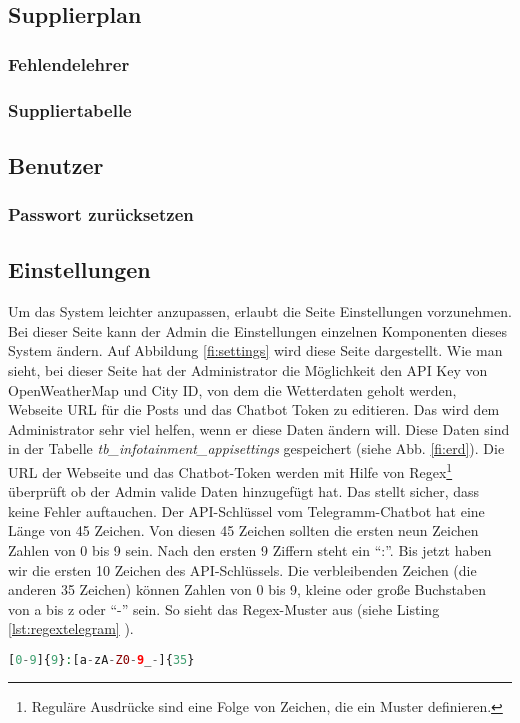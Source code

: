 \subsection{Supplierplan}
\subsubsection{Fehlendelehrer}
\subsubsection{Suppliertabelle}
\subsection{Benutzer}
\subsubsection{Passwort zurücksetzen}

\subsection{Einstellungen}
Um das System leichter anzupassen, erlaubt die Seite Einstellungen vorzunehmen. Bei dieser Seite kann der Admin die Einstellungen einzelnen Komponenten dieses System ändern. Auf Abbildung \ref{fi:settings} wird diese Seite dargestellt. Wie man sieht, bei dieser Seite hat der Administrator die Möglichkeit den API Key von OpenWeatherMap und City ID, von dem die Wetterdaten geholt werden, Webseite URL für die Posts und das Chatbot Token zu editieren. Das wird dem Administrator sehr viel helfen, wenn er diese Daten ändern will. Diese Daten sind in der Tabelle \textit{tb\_infotainment\_appisettings} gespeichert (siehe Abb. \ref{fi:erd}). Die URL der Webseite und das Chatbot-Token werden mit Hilfe von Regex\footnote{Reguläre Ausdrücke sind eine Folge von Zeichen, die ein Muster definieren.} überprüft ob der Admin valide Daten hinzugefügt hat. Das stellt sicher, dass keine Fehler auftauchen. Der API-Schlüssel vom Telegramm-Chatbot hat eine Länge von 45 Zeichen. Von diesen 45 Zeichen sollten die ersten neun Zeichen Zahlen von 0 bis 9 sein. Nach den ersten 9 Ziffern steht ein ``:''. Bis jetzt haben wir die ersten 10 Zeichen des API-Schlüssels. Die verbleibenden Zeichen (die anderen 35 Zeichen) können Zahlen von 0 bis 9, kleine oder große Buchstaben von a bis z oder ``-'' sein. So sieht das Regex-Muster aus (siehe Listing \ref{lst:regextelegram} ).
\begin{lstlisting}[caption={Regex Muster für Telegram Chatbot API-Key},label={lst:regextelegram},language=PHP]
[0-9]{9}:[a-zA-Z0-9_-]{35}
\end{lstlisting}

